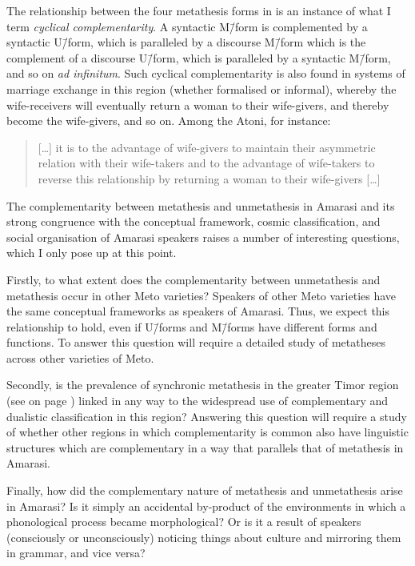 The relationship between the four metathesis forms in  is
an instance of what I term \emph{cyclical complementarity}.
A syntactic M\=/form is complemented by a syntactic U\=/form,
which is paralleled by a discourse M\=/form which is the complement
of a discourse U\=/form, which is paralleled by a syntactic M\=/form,
and so on \emph{ad infinitum}.
Such cyclical complementarity is also found in
systems of marriage exchange in this region (whether formalised or informal),
whereby the wife-receivers will eventually return a woman to their wife-givers,
and thereby become the wife-givers, and so on.
Among the Atoni, for instance:

\begin{quote}
[\ldots] it is to the advantage of wife-givers to maintain their
asymmetric relation with their wife-takers and to the advantage of wife-takers
to reverse this relationship by returning a woman to their wife-givers [\ldots]
\citep{fo99}
\end{quote}

The complementarity between metathesis and unmetathesis in Amarasi
and its strong congruence with the conceptual framework,
cosmic classification, and social organisation of Amarasi speakers
raises a number of interesting questions,
which I only pose up at this point.

Firstly, to what extent does the complementarity between unmetathesis and
metathesis occur in other Meto varieties?
Speakers of other Meto varieties have the same conceptual frameworks
as speakers of Amarasi. Thus, we expect this relationship to hold,
even if U\=/forms and M\=/forms have different forms and functions.
To answer this question will require a detailed study of
metatheses across other varieties of Meto.

Secondly, is the prevalence of synchronic metathesis in the greater Timor region
(see  on page \pageref{fig:CVMetTimReg}) linked in any way
to the widespread use of complementary and dualistic classification in this region?
Answering this question will require a study of whether other regions
in which complementarity is common also have linguistic structures
which are complementary in a way that parallels that of metathesis in Amarasi.

Finally, how did the complementary nature of metathesis and unmetathesis arise in Amarasi?
Is it simply an accidental by-product of the environments
in which a phonological process became morphological?
Or is it a result of speakers (consciously or unconsciously)
noticing things about culture and mirroring them in grammar, and vice versa?

